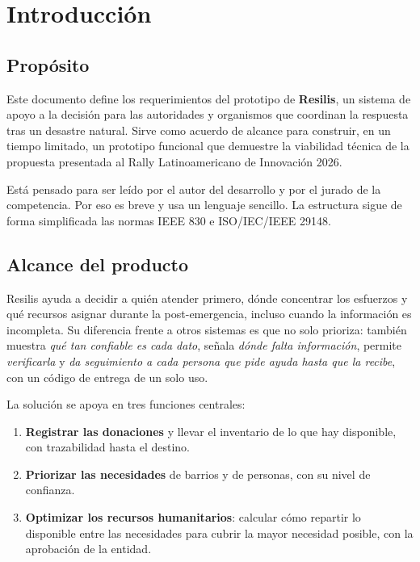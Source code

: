 \section{Introducción}

\subsection{Propósito}
Este documento define los requerimientos del prototipo de \textbf{Resilis}, un sistema de apoyo a la decisión para las autoridades y organismos que coordinan la respuesta tras un desastre natural. Sirve como acuerdo de alcance para construir, en un tiempo limitado, un prototipo funcional que demuestre la viabilidad técnica de la propuesta presentada al Rally Latinoamericano de Innovación 2026.

Está pensado para ser leído por el autor del desarrollo y por el jurado de la competencia. Por eso es breve y usa un lenguaje sencillo. La estructura sigue de forma simplificada las normas IEEE 830 e ISO/IEC/IEEE 29148.

\subsection{Alcance del producto}
Resilis ayuda a decidir a quién atender primero, dónde concentrar los esfuerzos y qué recursos asignar durante la post-emergencia, incluso cuando la información es incompleta. Su diferencia frente a otros sistemas es que no solo prioriza: también muestra \emph{qué tan confiable es cada dato}, señala \emph{dónde falta información}, permite \emph{verificarla} y \emph{da seguimiento a cada persona que pide ayuda hasta que la recibe}, con un código de entrega de un solo uso.

La solución se apoya en tres funciones centrales:
\begin{enumerate}
  \item \textbf{Registrar las donaciones} y llevar el inventario de lo que hay disponible, con trazabilidad hasta el destino.
  \item \textbf{Priorizar las necesidades} de barrios y de personas, con su nivel de confianza.
  \item \textbf{Optimizar los recursos humanitarios}: calcular cómo repartir lo disponible entre las necesidades para cubrir la mayor necesidad posible, con la aprobación de la entidad.
\end{enumerate}

